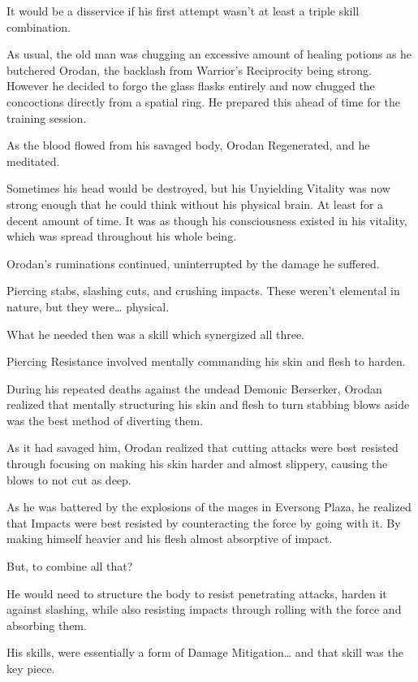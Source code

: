 \documentclass[a4paper,10pt]{book}
\begin{document}
It would be a disservice if his first attempt wasn’t at least a triple skill combination.\par
As usual, the old man was chugging an excessive amount of healing potions as he butchered Orodan, the backlash from Warrior’s Reciprocity being strong. However he decided to forgo the glass flasks entirely and now chugged the concoctions directly from a spatial ring. He prepared this ahead of time for the training session.\par
As the blood flowed from his savaged body, Orodan Regenerated, and he meditated.\par
Sometimes his head would be destroyed, but his Unyielding Vitality was now strong enough that he could think without his physical brain. At least for a decent amount of time. It was as though his consciousness existed in his vitality, which was spread throughout his whole being.\par
Orodan’s ruminations continued, uninterrupted by the damage he suffered.\par
Piercing stabs, slashing cuts, and crushing impacts. These weren’t elemental in nature, but they were… physical.\par
What he needed then was a skill which synergized all three.\par
Piercing Resistance involved mentally commanding his skin and flesh to harden.\par
During his repeated deaths against the undead Demonic Berserker, Orodan realized that mentally structuring his skin and flesh to turn stabbing blows aside was the best method of diverting them.\par
As it had savaged him, Orodan realized that cutting attacks were best resisted through focusing on making his skin harder and almost slippery, causing the blows to not cut as deep.\par
As he was battered by the explosions of the mages in Eversong Plaza, he realized that Impacts were best resisted by counteracting the force by going with it. By making himself heavier and his flesh almost absorptive of impact.\par
But, to combine all that?\par
He would need to structure the body to resist penetrating attacks, harden it against slashing, while also resisting impacts through rolling with the force and absorbing them.\par
His skills, were essentially a form of Damage Mitigation… and that skill was the key piece.\par
\end{document}
